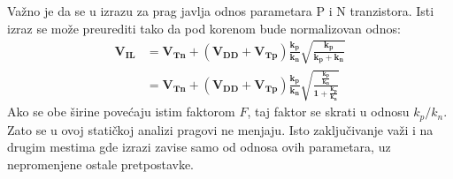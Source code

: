 Važno je da se u izrazu za prag javlja odnos parametara P i N tranzistora. Isti izraz se može preurediti tako da pod korenom bude normalizovan odnos:
\[\boldsymbol{\begin{aligned}V_{IL}&=V_{Tn}+(V_{DD}+V_{Tp})\frac{k_p}{k_n}\sqrt{\frac{k_p}{k_p+k_n}}\\&=V_{Tn}+(V_{DD}+V_{Tp})\frac{k_p}{k_n}\sqrt{\frac{\frac{k_p}{k_n}}{1+\frac{k_p}{k_n}}}\end{aligned}}\]
Ako se obe širine povećaju istim faktorom $F$, taj faktor se skrati u odnosu $k_p/k_n$. Zato se u ovoj statičkoj analizi pragovi ne menjaju. Isto zaključivanje važi i na drugim mestima gde izrazi zavise samo od odnosa ovih parametara, uz nepromenjene ostale pretpostavke.
